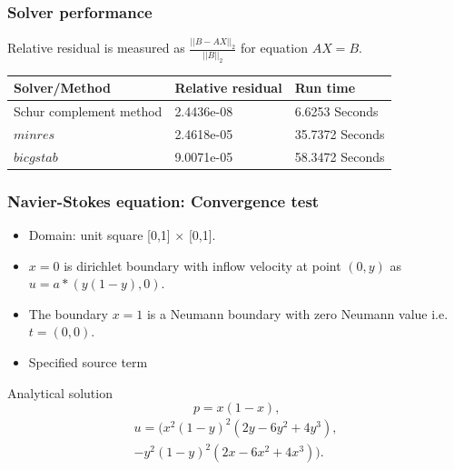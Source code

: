 \documentclass{beamer}
\begin{document}
\begin{frame}
\frametitle{Solver performance}

Relative residual is measured as $\frac{||B-AX||_2}{||B||_2}$ for equation $AX=B$.

\begin{longtable}{| p{} | p{} | p{} |}
\hline
\textbf{Solver/Method} & \textbf{Relative residual} & \textbf{Run time}\\
\hline
Schur complement method & 2.4436e-08 & 6.6253 Seconds\\
\hline
$minres$ & 2.4618e-05 & 35.7372 Seconds\\
\hline
$bicgstab$ & 9.0071e-05 & 58.3472 Seconds\\
\hline
\end{longtable}

\end{frame}
\begin{frame}
\frametitle{Navier-Stokes equation: Convergence test}
\begin{itemize}
\item Domain: unit square [0,1] $\times$ [0,1].
\item ${x=0}$ is dirichlet boundary with inflow velocity at point $(0,y)$ as $u = a*(y(1-y), 0)$.
\item The boundary ${x = 1}$ is a Neumann boundary with zero Neumann value i.e. $t = (0, 0)$. 
\item Specified source term
\end{itemize}
\begin{block}{Analytical solution}
\begin{equation}
p = x(1 - x) \textrm{,}
\end{equation}
\begin{equation} 
\begin{split}
u = (x^2(1-y)^2(2y-6y^2+4y^3),\\-y^2(1-y)^2(2x-6x^2+4x^3)) \textrm{.}
\end{split}
\end{equation}
\end{block}
\end{frame}
\end{document}
